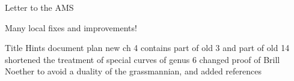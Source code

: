Letter to the AMS

Many local fixes and improvements!

Title
Hints document plan
new ch 4 contains part of old 3 and part of old 14
shortened the treatment of special curves of genus 6
changed proof of Brill Noether to avoid a duality of the grassmannian, and added references




